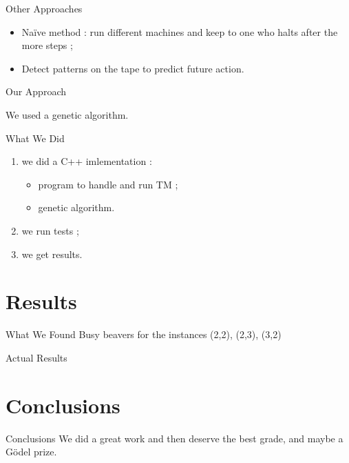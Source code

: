 \documentclass{beamer}
\begin{document}
\begin{frame}{Other Approaches}

\begin{itemize}
\item Naïve method : run different machines and keep to one who halts after the more steps ; %
\item Detect patterns on the tape to predict future action.
\end{itemize}

\end{frame}

\begin{frame}{Our Approach}

We used a genetic algorithm.
\end{frame}

\begin{frame}{What We Did}

\begin{enumerate}
\item we did a C++ imlementation :
  \begin{itemize}
  \item program to handle and run TM ;
  \item genetic algorithm.
  \end{itemize}
\item we run tests ;
\item we get results.
\end{enumerate}
\end{frame}

\section{Results}

\begin{frame}{What We Found}
Busy beavers for the instances (2,2), (2,3), (3,2)
\end{frame}

\begin{frame}{Actual Results}
\end{frame}

\section{Conclusions}

\begin{frame}{Conclusions}
We did a great work and then deserve the best grade, and maybe a Gödel prize.
\end{frame}
\end{document}
